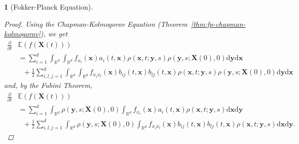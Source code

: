 \documentclass[english]{article}
\numberwithin{equation}{section}
\numberwithin{figure}{section}
\theoremstyle{bolddescit}
\newtheorem{theorem}{\protect\theoremname}[section]
\theoremstyle{definition}
\theoremstyle{definition}
\theoremstyle{plain}
\theoremstyle{plain}
\theoremstyle{bolddesc}
\theoremstyle{plain}
\theoremstyle{remark}
\providecommand{\theoremname}{Theorem}
\begin{document}
\begin{theorem}[Fokker-Planck Equation]
\begin{proof}
    Using the Chapman-Kolmogorov Equation (Theorem~\ref{thm:fp-chapman-kolmogorov}), we get
    \begin{align*}
      \frac{\partial}{\partial t}&\mathbb{E}(f(\mathbf{X}(t)))\\
      &= \sum_{i=1}^{d} \int_{\mathbb{R}^d} \int_{\mathbb{R}^d} f_{x_i}(\mathbf{x}) a_i(t,\mathbf{x})\rho(\mathbf{x},t;\mathbf{y},s) \rho(\mathbf{y},s;\mathbf{X}(0),0) \mathrm{d}\mathbf{y} \mathrm{d}\mathbf{x}\\
        &\ \ \ + \frac{1}{2} \sum_{i,l,j=1}^{d} \int_{\mathbb{R}^d} \int_{\mathbb{R}^d} f_{x_i x_l}(\mathbf{x}) b_{ij}(t,\mathbf{x}) b_{lj}(t,\mathbf{x}) \rho(\mathbf{x},t;\mathbf{y},s) \rho(\mathbf{y},s;\mathbf{X}(0),0) \mathrm{d}\mathbf{y} \mathrm{d}\mathbf{x}
    \end{align*}
    and, by the Fubini Theorem,
    \begin{align*}
      \frac{\partial}{\partial t}&\mathbb{E}(f(\mathbf{X}(t)))\\
      &= \sum_{i=1}^{d} \int_{\mathbb{R}^d}  \rho(\mathbf{y},s;\mathbf{X}(0),0) \int_{\mathbb{R}^d} f_{x_i}(\mathbf{x}) a_i(t,\mathbf{x}) \rho(\mathbf{x},t;\mathbf{y},s) \mathrm{d}\mathbf{x} \mathrm{d}\mathbf{y}\\
        &\ \ \ + \frac{1}{2} \sum_{i,l,j=1}^{d} \int_{\mathbb{R}^d} \rho(\mathbf{y},s;\mathbf{X}(0),0) \int_{\mathbb{R}^d} f_{x_i x_l}(\mathbf{x}) b_{ij}(t,\mathbf{x}) b_{lj}(t,\mathbf{x}) \rho(\mathbf{x},t;\mathbf{y},s) \mathrm{d}\mathbf{x} \mathrm{d}\mathbf{y}.
    \end{align*}


\end{proof}
\end{theorem}
\end{document}
